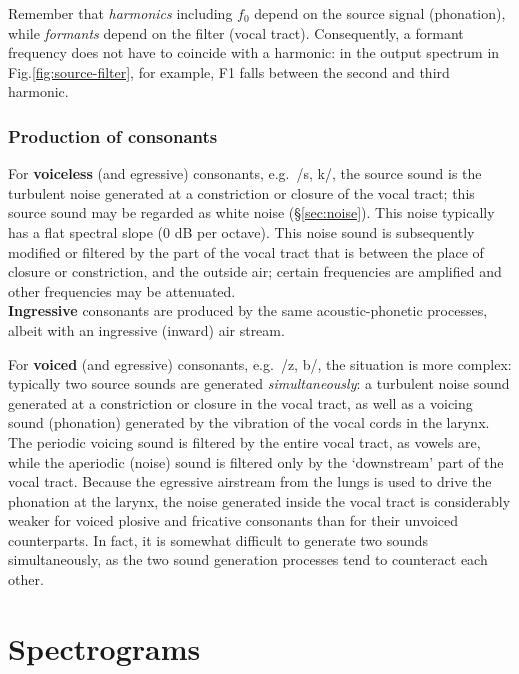 \documentclass[
]{book}
\begin{document}
Remember that \emph{harmonics} including \(f_0\) depend on the source signal (phonation), while \emph{formants} depend on the filter (vocal tract). Consequently, a formant frequency does not have to coincide with a harmonic: in the output spectrum in Fig.\ref{fig:source-filter}, for example, F1 falls between the second and third harmonic.

\subsection{Production of consonants}\label{production-of-consonants}

For \textbf{voiceless} (and egressive) consonants, e.g.~/s, k/, the source sound is the turbulent noise generated at a constriction or closure of the vocal tract; this source sound may be regarded as white noise (§\ref{sec:noise}). This noise typically has a flat spectral slope (\(0\) dB per octave). This noise sound is subsequently modified or filtered by the part of the vocal tract that is between the place of closure or constriction, and the outside air; certain frequencies are amplified and other frequencies may be attenuated.\\

\textbf{Ingressive} consonants are produced by the same acoustic-phonetic processes, albeit with an ingressive (inward) air stream.

For \textbf{voiced} (and egressive) consonants, e.g.~/z, b/, the situation is more complex: typically two source sounds are generated \emph{simultaneously}: a turbulent noise sound generated at a constriction or closure in the vocal tract, as well as a voicing sound (phonation) generated by the vibration of the vocal cords in the larynx. The periodic voicing sound is filtered by the entire vocal tract, as vowels are, while the aperiodic (noise) sound is filtered only by the `downstream' part of the vocal tract.
Because the egressive airstream from the lungs is used to drive the phonation at the larynx, the noise generated inside the vocal tract is considerably weaker for voiced plosive and fricative consonants than for their unvoiced counterparts. In fact, it is somewhat difficult to generate two sounds simultaneously, as the two sound generation processes tend to counteract each other.

\chapter{Spectrograms}\label{ch-spectrograms}
\end{document}
